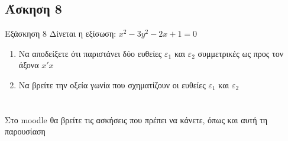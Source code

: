 \documentclass[greek]{beamer}
\begin{document}
\subsection{Άσκηση 8}
\begin{frame}[label=Άσκηση8]{Εξάσκηση 8}
 Δίνεται η εξίσωση: $x^2-3y^2-2x+1=0$
 \begin{enumerate}
   \item<1-> Να αποδείξετε ότι παριστάνει δύο ευθείες $ε_1$ και $ε_2$ συμμετρικές ως προς τον άξονα $x'x$
   \item<2-> Να βρείτε την οξεία γωνία που σχηματίζουν οι ευθείες $ε_1$ και $ε_2$
 \end{enumerate}

\end{frame}

\section{}
\begin{frame}
 Στο moodle θα βρείτε τις ασκήσεις που πρέπει να κάνετε, όπως και αυτή τη παρουσίαση
\end{frame}

\end{document}
